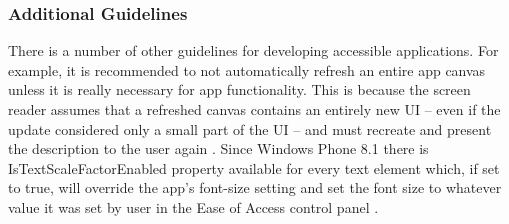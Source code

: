 \subsubsection{Additional Guidelines}
There is a number of other guidelines for developing accessible applications. For example, it is recommended to not automatically refresh an entire app canvas unless it is really necessary for app functionality. This is because the screen reader assumes that a refreshed canvas contains an entirely new UI – even if the update considered only a small part of the UI – and must recreate and present the description to the user again \cite{wp8guide}.
Since Windows Phone 8.1 there is IsTextScaleFactorEnabled property available for every text element which, if set to true, will override the app's font-size setting and set the font size to whatever value it was set by user in the Ease of Access control panel \cite{wp8guide}.
